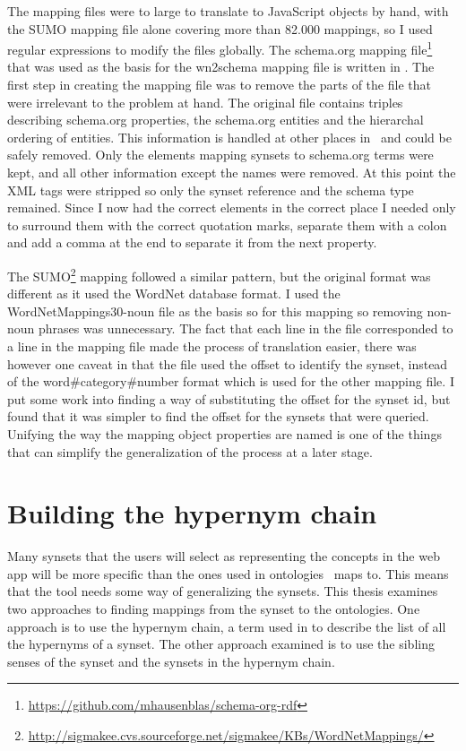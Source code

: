 The mapping files were to large to translate to JavaScript objects by hand, with the SUMO mapping file alone
covering more than 82.000 mappings, so I used regular expressions to modify the files globally.
The schema.org mapping file\footnote{\url{https://github.com/mhausenblas/schema-org-rdf}}
that was used as the basis for the wn2schema mapping file is written in .
The first step in creating the mapping file was to remove the parts of the file that were irrelevant to the problem at hand.
The original file contains triples describing schema.org properties,
the schema.org entities and the hierarchal ordering of entities.
This information is handled at other places in \theartefact\ and could be safely removed.
Only the elements mapping synsets to schema.org terms were kept, and all other information except the names were removed.
At this point the XML tags were stripped so only the synset reference and the schema type remained.
Since I now had the correct elements in the correct place I needed only to surround them with the correct quotation
marks, separate them with a colon and add a comma at the end to separate it from the next property.

The SUMO\footnote{\url{http://sigmakee.cvs.sourceforge.net/sigmakee/KBs/WordNetMappings/}} mapping followed a similar pattern,
but the original format was different as it used the WordNet database format.
I used the WordNetMappings30-noun file as the basis so for this mapping so removing non-noun phrases was unnecessary.
The fact that each line in the file corresponded to a line in the mapping file made the process of translation easier,
there was however one caveat in that the file used the offset to identify the synset,
instead of the word\#category\#number format which is used for the other mapping file.
I put some work into finding a way of substituting the offset for the synset id,
but found that it was simpler to find the offset for the synsets that were queried.
Unifying the way the mapping object properties are named is one of the things that can simplify
the generalization of the process at a later stage.



\section{Building the hypernym chain}
\label{BuildingTheHypernymChain}
Many synsets that the users will select as representing the concepts in the web app will be more specific than
the ones used in ontologies \theartefact\ maps to.
This means that the tool needs some way of generalizing the synsets.
This thesis examines two approaches to finding mappings from the synset to the ontologies.
One approach is to use the hypernym chain,
a term used in \citet{Veres2011} to describe the list of all the hypernyms of a synset.
The other approach examined is to use the sibling senses of the synset and the synsets in the hypernym chain.

